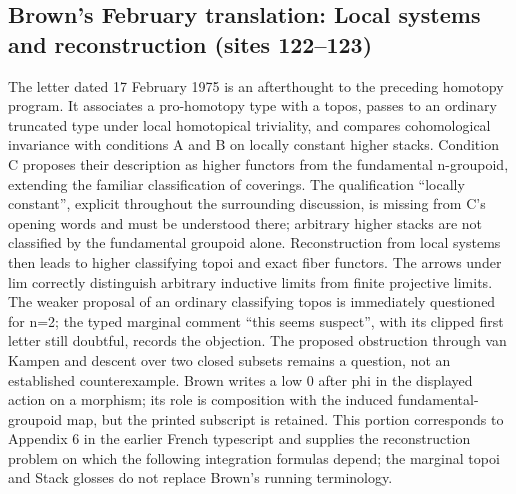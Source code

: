 \documentclass[10pt,oneside]{book}
\begin{document}
\subsection*{Brown's February translation: Local systems and reconstruction (sites 122--123)}
The letter dated 17 February 1975 is an afterthought to the preceding homotopy program. It associates a pro-homotopy type with a topos, passes to an ordinary truncated type under local homotopical triviality, and compares cohomological invariance with conditions A and B on locally constant higher stacks. Condition C proposes their description as higher functors from the fundamental n-groupoid, extending the familiar classification of coverings. The qualification ``locally constant'', explicit throughout the surrounding discussion, is missing from C's opening words and must be understood there; arbitrary higher stacks are not classified by the fundamental groupoid alone. Reconstruction from local systems then leads to higher classifying topoi and exact fiber functors. The arrows under lim correctly distinguish arbitrary inductive limits from finite projective limits. The weaker proposal of an ordinary classifying topos is immediately questioned for n=2; the typed marginal comment ``this seems suspect'', with its clipped first letter still doubtful, records the objection. The proposed obstruction through van Kampen and descent over two closed subsets remains a question, not an established counterexample. Brown writes a low 0 after phi in the displayed action on a morphism; its role is composition with the induced fundamental-groupoid map, but the printed subscript is retained. This portion corresponds to Appendix 6 in the earlier French typescript and supplies the reconstruction problem on which the following integration formulas depend; the marginal topoi and Stack glosses do not replace Brown's running terminology.
\end{document}
